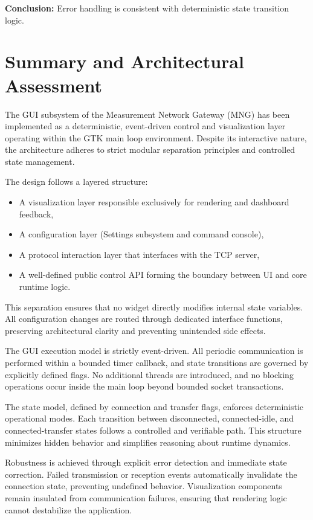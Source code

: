 \textbf{Conclusion:}  
Error handling is consistent with deterministic state transition logic.

\section{Summary and Architectural Assessment}
\label{sec:gui_summary}

The GUI subsystem of the Measurement Network Gateway (MNG) has been implemented as a deterministic, event-driven control and visualization layer operating within the GTK main loop environment. Despite its interactive nature, the architecture adheres to strict modular separation principles and controlled state management.

The design follows a layered structure:

\begin{itemize}
	\item A visualization layer responsible exclusively for rendering and dashboard feedback,
	\item A configuration layer (Settings subsystem and command console),
	\item A protocol interaction layer that interfaces with the TCP server,
	\item A well-defined public control API forming the boundary between UI and core runtime logic.
\end{itemize}

This separation ensures that no widget directly modifies internal state variables. All configuration changes are routed through dedicated interface functions, preserving architectural clarity and preventing unintended side effects.

The GUI execution model is strictly event-driven. All periodic communication is performed within a bounded timer callback, and state transitions are governed by explicitly defined flags. No additional threads are introduced, and no blocking operations occur inside the main loop beyond bounded socket transactions.

The state model, defined by connection and transfer flags, enforces deterministic operational modes. Each transition between disconnected, connected-idle, and connected-transfer states follows a controlled and verifiable path. This structure minimizes hidden behavior and simplifies reasoning about runtime dynamics.

Robustness is achieved through explicit error detection and immediate state correction. Failed transmission or reception events automatically invalidate the connection state, preventing undefined behavior. Visualization components remain insulated from communication failures, ensuring that rendering logic cannot destabilize the application.

